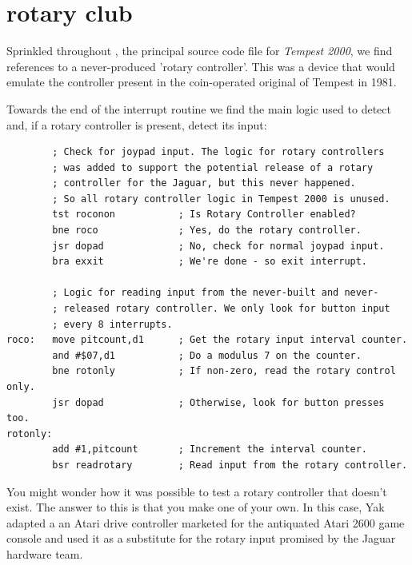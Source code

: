 \chapter{rotary club}
\label{sec:rotaryclub}
\lstset{style=68KStyle}
\lhead[tempest 2000]{}

Sprinkled throughout , the principal source code file for \textit{Tempest 2000}, we
find references to a never-produced 'rotary controller'. This was a device that would emulate
the controller present in the coin-operated original of Tempest in 1981.

Towards the end of the  interrupt routine we find the main logic used to detect
and, if a rotary controller is present, detect its input:
\begin{lstlisting}
        ; Check for joypad input. The logic for rotary controllers
        ; was added to support the potential release of a rotary
        ; controller for the Jaguar, but this never happened.
        ; So all rotary controller logic in Tempest 2000 is unused.
        tst roconon           ; Is Rotary Controller enabled?
        bne roco              ; Yes, do the rotary controller.
        jsr dopad             ; No, check for normal joypad input.
        bra exxit             ; We're done - so exit interrupt.
    
        ; Logic for reading input from the never-built and never-
        ; released rotary controller. We only look for button input
        ; every 8 interrupts.
roco:   move pitcount,d1      ; Get the rotary input interval counter.
        and #$07,d1           ; Do a modulus 7 on the counter.
        bne rotonly           ; If non-zero, read the rotary control only.
        jsr dopad             ; Otherwise, look for button presses too.
rotonly:
        add #1,pitcount       ; Increment the interval counter.
        bsr readrotary        ; Read input from the rotary controller.
\end{lstlisting}
You might wonder how it was possible to test a rotary controller that doesn't exist.
The answer to this is that you make one of your own. In this case, Yak adapted a 
an Atari drive controller marketed for the antiquated Atari 2600 game console and used
it as a substitute for the rotary input promised by the Jaguar hardware team.

